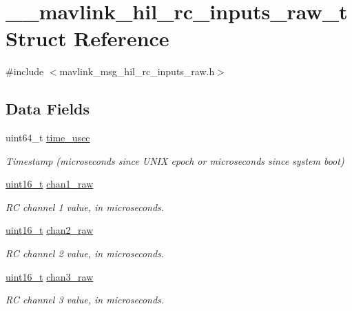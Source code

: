 \hypertarget{struct____mavlink__hil__rc__inputs__raw__t}{\section{\-\_\-\-\_\-mavlink\-\_\-hil\-\_\-rc\-\_\-inputs\-\_\-raw\-\_\-t Struct Reference}
\label{struct____mavlink__hil__rc__inputs__raw__t}
}


{\ttfamily \#include $<$mavlink\-\_\-msg\-\_\-hil\-\_\-rc\-\_\-inputs\-\_\-raw.\-h$>$}

\subsection*{Data Fields}
\begin{DoxyCompactItemize}
\item 
uint64\-\_\-t \hyperlink{struct____mavlink__hil__rc__inputs__raw__t_a17665e54cab99a69ff2e6d3b8ae63928}{time\-\_\-usec}
\begin{DoxyCompactList}\small\item\em Timestamp (microseconds since U\-N\-I\-X epoch or microseconds since system boot) \end{DoxyCompactList}\item 
\hyperlink{stdint_8h_a273cf69d639a59973b6019625df33e30}{uint16\-\_\-t} \hyperlink{struct____mavlink__hil__rc__inputs__raw__t_a1c71d0b0abbff7055c0753a8b8a116bc}{chan1\-\_\-raw}
\begin{DoxyCompactList}\small\item\em R\-C channel 1 value, in microseconds. \end{DoxyCompactList}\item 
\hyperlink{stdint_8h_a273cf69d639a59973b6019625df33e30}{uint16\-\_\-t} \hyperlink{struct____mavlink__hil__rc__inputs__raw__t_a0210c7a3752c816e694c38e9fa85b8ed}{chan2\-\_\-raw}
\begin{DoxyCompactList}\small\item\em R\-C channel 2 value, in microseconds. \end{DoxyCompactList}\item 
\hyperlink{stdint_8h_a273cf69d639a59973b6019625df33e30}{uint16\-\_\-t} \hyperlink{struct____mavlink__hil__rc__inputs__raw__t_a4f05c2ed52ec8aed527bc31331f74247}{chan3\-\_\-raw}
\begin{DoxyCompactList}\small\item\em R\-C channel 3 value, in microseconds. \end{DoxyCompactList}\item 

\end{DoxyCompactItemize}
